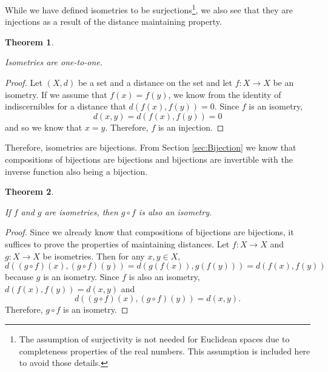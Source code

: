\documentclass[
]{book}
\newtheorem{theorem}{Theorem}[chapter]
\theoremstyle{definition}
\theoremstyle{definition}
\theoremstyle{definition}
\theoremstyle{definition}
\theoremstyle{remark}
\begin{document}
While we have defined isometries to be surjections\footnote{The assumption of surjectivity is not needed for Euclidean spaces due to completeness properties of the real numbers. This assumption is included here to avoid those details.}, we also see that they are injections as a result of the distance maintaining property.

\begin{theorem}
\protect\hypertarget{thm:unlabeled-div-241}{}\label{thm:unlabeled-div-241}

Isometries are one-to-one.

\end{theorem}

\begin{proof}

Let \((X,d)\) be a set and a distance on the set and let \(f:X\rightarrow X\) be an isometry. If we assume that \(f(x)=f(y)\), we know from the identity of indiscernibles for a distance that \(d(f(x),f(y))=0\). Since \(f\) is an isometry, \[d(x,y)= d(f(x),f(y))=0\] and so we know that \(x=y\). Therefore, \(f\) is an injection.

\end{proof}

Therefore, isometries are bijections. From Section \ref{sec:Bijection} we know that compositions of bijections are bijections and bijections are invertible with the inverse function also being a bijection.

\begin{theorem}
\protect\hypertarget{thm:unlabeled-div-243}{}\label{thm:unlabeled-div-243}

If \(f\) and \(g\) are isometries, then \(g\circ f\) is also an isometry.

\end{theorem}

\begin{proof}

Since we already know that compositions of bijections are bijections, it suffices to prove the properties of maintaining distances. Let \(f:X\rightarrow X\) and \(g:X\rightarrow X\) be isometries. Then for any \(x,y\in X\),
\[d\left((g\circ f)(x),(g\circ f)(y) \right) = d\left( g(f(x)),g(f(y))\right) = d\left(f(x),f(y)\right)\] because \(g\) is an isometry. Since \(f\) is also an isometry, \(d\left(f(x),f(y)\right) = d(x,y)\) and \[d\left((g\circ f)(x),(g\circ f)(y) \right) = d(x,y).\] Therefore, \(g\circ f\) is an isometry.

\end{proof}
\end{document}
